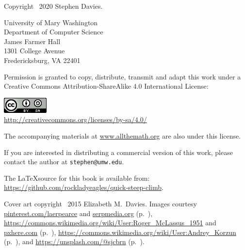 
\thispagestyle{empty}

Copyright \textcopyright \ 2020 Stephen Davies.

\bigskip

University of Mary Washington\\
Department of Computer Science\\
James Farmer Hall\\
1301 College Avenue\\
Fredericksburg, VA  22401

\vspace{.4in}

Permission is granted to copy, distribute, transmit and adapt this work under a
Creative Commons Attribution-ShareAlike 4.0 International License:

\begin{center}
\includegraphics{cc_license.png}\\
\smallskip
\url{http://creativecommons.org/licenses/by-sa/4.0/}
\end{center}

The accompanying materials at \url{www.allthemath.org} are also under this
license.

\vspace{.2in}
If you are interested in distributing a commercial version of this work, please
contact the author at \texttt{stephen@umw.edu}.

\vspace{.4in}
The \LaTeX source for this book is available from:
\url{https://github.com/rockladyeagles/quick-steep-climb}.


\vspace{.7in}
Cover art copyright \textcopyright \ 2015 Elizabeth M.~Davies.
Images courtesy \url{pinterest.com/laerpearce} and \url{serpmedia.org}
(p.~\pageref{tacoma}),
\url{https://commons.wikimedia.org/wiki/User:Roger\_McLassus\_1951} and
\url{pxhere.com} (p.~\pageref{slinky}),
\url{https://commons.wikimedia.org/wiki/User:Andrey\_Korzun}
(p.~\pageref{orchard}), and \url{https://unsplash.com/@sjcbrn}
(p.~\pageref{stormtrooper}).
